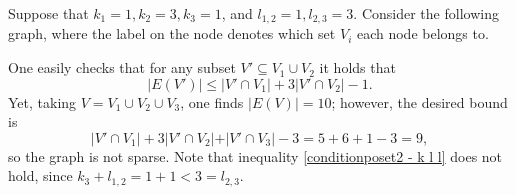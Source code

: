 \documentclass{article}
\begin{document}
\begin{example}
Suppose that $k_1 = 1, k_2=3, k_3=1$, and $l_{1,2}=1, l_{2,3}=3$. Consider the following graph, where the label on the node denotes which set $V_i$ each node belongs to.
\begin{center}
\end{center}
One easily checks that for any subset
    $V' \subseteq V_1 \cup V_2$
it holds that
\begin{equation*}
 \vert E(V') \vert \leq  \vert V' \cap V_1 \vert  + 3 \vert V' \cap V_2 \vert - 1.
\end{equation*}
Yet, taking $V= V_1\cup V_2 \cup V_3$, one finds $\vert E(V)\vert =10$; however, the desired bound is
\begin{equation*}
\vert V' \cap V_1 \vert  + 3 \vert V' \cap V_2 \vert +  \vert V' \cap V_3 \vert - 3 = 5 + 6 +1 - 3 =9,
\end{equation*}
so the graph is not sparse. Note that inequality \eqref{conditionposet2 - k l l} does not hold, since $k_{3}+l_{1,2} =1+1 < 3 = l_{2,3}$.
\end{example}
\end{document}
